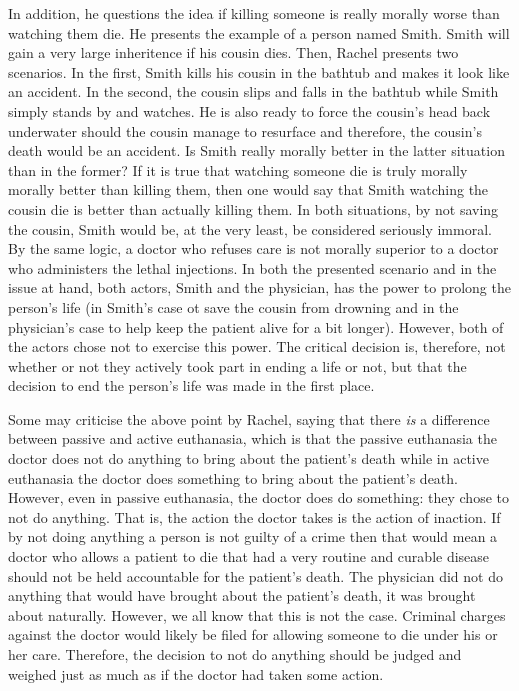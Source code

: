 \documentclass{article}
\begin{document}
In addition, he questions the idea if killing someone is really morally worse than watching them die.
He presents the example of a person named Smith. Smith will gain a very large inheritence if his cousin
dies. Then, Rachel presents two scenarios. In the first, Smith kills his cousin in the bathtub and makes
it look like an accident. In the second, the cousin slips and falls in the bathtub while Smith simply
stands by and watches. He is also ready to force the cousin's head back underwater should the cousin
manage to resurface and therefore, the cousin's death would be an accident. Is Smith really morally
better in the latter situation than in the former? If it is true that watching someone die is truly
morally morally better than killing them, then one would say that Smith watching the cousin die is
better than actually killing them. In both situations, by not saving the cousin, Smith would be,
at the very least, be considered seriously immoral. By the same logic, a doctor who refuses care is
not morally superior to a doctor who administers the lethal injections. In both the presented scenario
and in the issue at hand, both actors, Smith and the physician, has the power to prolong the person's
life (in Smith's case ot save the cousin from drowning and in the physician's case to help keep the
patient alive for a bit longer). However, both of the actors chose not to exercise this power. The
critical decision is, therefore, not whether or not they actively took part in ending a life or not,
but that the decision to end the person's life was made in the first place.

Some may criticise the above point by Rachel, saying that there {\em is} a difference between passive
and active euthanasia, which is that the passive euthanasia the doctor does not do anything to bring
about the patient's death while in active euthanasia the doctor does something to bring about the
patient's death. However, even in passive euthanasia, the doctor does do something: they chose to
not do anything. That is, the action the doctor takes is the action of inaction. If by not doing anything
a person is not guilty of a crime then that would mean a doctor who allows a patient to die that had
a very routine and curable disease should not be held accountable for the patient's death. The physician
did not do anything that would have brought about the patient's death, it was brought about naturally.
However, we all know that this is not the case. Criminal charges against the doctor would likely be filed
for allowing someone to die under his or her care. Therefore, the decision to not do anything should be
judged and weighed just as much as if the doctor had taken some action.
\end{document}
